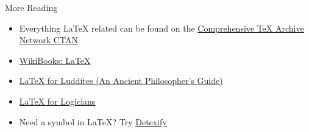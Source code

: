 \begin{frame}{More Reading}

\begin{itemize}
\item Everything \LaTeX{} related can be found on the
  \href{http://www.ctan.org/}{Comprehensive \TeX{} Archive Network
    CTAN}
\item \href{http://en.wikibooks.org/wiki/LaTeX}{WikiBooks: \LaTeX}
\item
  \href{http://individual.utoronto.ca/williecostello/latex.html}{\LaTeX{}
    for Luddites (An Ancient Philosopher's Guide)}
\item
  \href{http://www.logicmatters.net/latex-for-logicians/}{\LaTeX{} for
    Logicians}
\item Need a symbol in \LaTeX? Try
  \href{http://detexify.kirelabs.org/classify.html}{Detexify}
\end{itemize}

\end{frame}



